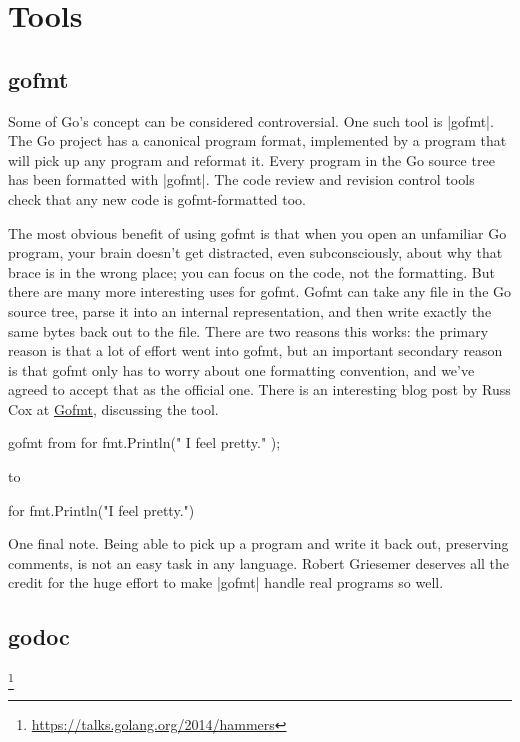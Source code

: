 \chapter{Tools}

\section{gofmt}

Some of Go's concept can be considered controversial. One such tool is |gofmt|. The Go project has 
a canonical program format, implemented by a program that will pick up any program and reformat it.
Every program in the Go source tree has been formatted with |gofmt|. The code review and revision control tools check that any new code is gofmt-formatted too.

The most obvious benefit of using gofmt is that when you open an unfamiliar Go program, your brain doesn't get distracted, even subconsciously, about why that brace is in the wrong place; you can focus on the code, not the formatting. But there are many more interesting uses for gofmt. Gofmt can take any file in the Go source tree, parse it into an internal representation, and then write exactly the same bytes back out to the file. There are two reasons this works: the primary reason is that a lot of effort went into gofmt, but an important secondary reason is that gofmt only has to worry about one formatting convention, and we've agreed to accept that as the official one.
There is an interesting blog post by Russ Cox at \href{http://research.swtch.com/gofmt}{Gofmt}, discussing the tool.

\begin{teX}
gofmt
from
for{
fmt.Println("    I feel pretty." );
       }
\end{teX}
       
to

\begin{teX}
for {
    fmt.Println("I feel pretty.")
}
\end{teX}

One final note. Being able to pick up a program and write it back out, preserving comments, is not an easy task in any language. Robert Griesemer deserves all the credit for the huge effort to make |gofmt| handle real programs so well.

\section{godoc}


\footnote{\protect\url{https://talks.golang.org/2014/hammers}}

